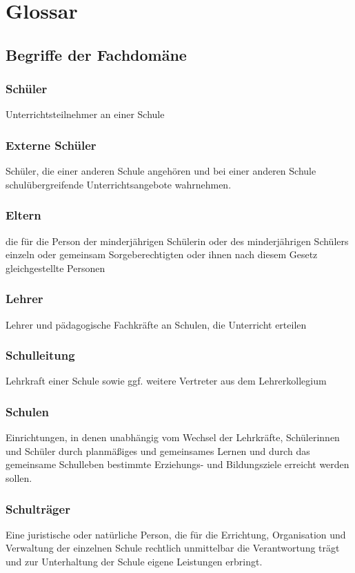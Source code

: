 \section{Glossar}
\label{glossary}

\subsection{Begriffe der Fachdomäne}

\subsubsection*{Schüler}
Unterrichtsteilnehmer an einer Schule

\subsubsection*{Externe Schüler}
Schüler, die einer anderen Schule angehören und bei einer anderen Schule schulübergreifende Unterrichtsangebote wahrnehmen.

\subsubsection*{Eltern}
die für die Person der minderjährigen Schülerin oder des minderjährigen Schülers einzeln oder gemeinsam Sorgeberechtigten oder ihnen nach diesem Gesetz gleichgestellte Personen

\subsubsection*{Lehrer}
Lehrer und pädagogische Fachkräfte an Schulen, die Unterricht erteilen

\subsubsection*{Schulleitung}
Lehrkraft einer Schule sowie ggf. weitere Vertreter aus dem Lehrerkollegium

\subsubsection*{Schulen}
Einrichtungen, in denen unabhängig vom Wechsel der Lehrkräfte, Schülerinnen und Schüler durch planmäßiges und gemeinsames Lernen und durch das gemeinsame Schulleben bestimmte Erziehungs- und Bildungsziele erreicht werden sollen.

\subsubsection*{Schulträger}
Eine juristische oder natürliche Person, die für die Errichtung, Organisation und Verwaltung der einzelnen Schule rechtlich unmittelbar die Verantwortung trägt und zur Unterhaltung der Schule eigene Leistungen erbringt.

